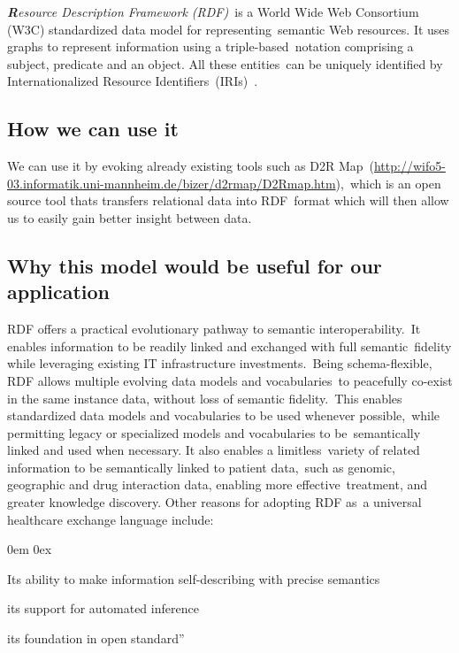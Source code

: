 \documentclass[DIV=calc, paper=a4, fontsize=12pt, onecolumn]{scrartcl}	 %
\newcommand{\initial}[1]{ %
\lettrine[lines=3,lhang=0.3,nindent=0em,slope=0em]{
\color{DarkBlue}
{\textbf{\textit{#1}}}}{}}
\begin{document}
  \initial{R}\textit{esource Description Framework (RDF)}\
  is a World Wide Web Consortium (W3C) standardized data model for representing\
  semantic Web resources. It uses graphs to represent information using a triple-based\
  notation comprising a subject, predicate and an object. All these entities\
  can be uniquely identified by Internationalized Resource Identifiers\
  (IRIs)~\citep{pathak_applying_2012}.

  \subsection{How we can use it}

  We can use it by evoking already existing tools such as D2R Map\
  (\url{http://wifo5-03.informatik.uni-mannheim.de/bizer/d2rmap/D2Rmap.htm}),\
  which is an open source tool thats transfers relational data into RDF\
  format which will then allow us to easily gain better insight between data.\

  \subsection{Why this model would be useful for our application}

  RDF offers a practical evolutionary pathway to semantic interoperability.\
  It enables information to be readily linked and exchanged with full semantic\
  fidelity while leveraging existing IT infrastructure investments.\
  Being schema-flexible, RDF allows multiple evolving data models and vocabularies\
  to peacefully co-exist in the same instance data, without loss of semantic fidelity.\
  This enables standardized data models and vocabularies to be used whenever possible,\ 
  while permitting legacy or specialized models and vocabularies to be\
  semantically linked and used when necessary. It also enables a limitless\
  variety of related information to be semantically linked to patient data,\
  such as genomic, geographic and drug interaction data, enabling more effective\
  treatment, and greater knowledge discovery. Other reasons for adopting RDF as\
  a universal healthcare exchange language include:
  \begin{description}
    \itemindent0em
    \itemsep0ex
    \item[(a)]  Its ability to make information self-describing with precise semantics
    \item[(b)] its support for automated inference
    \item[(c)]  its foundation in open standard''
  \end{description}
\end{document}
